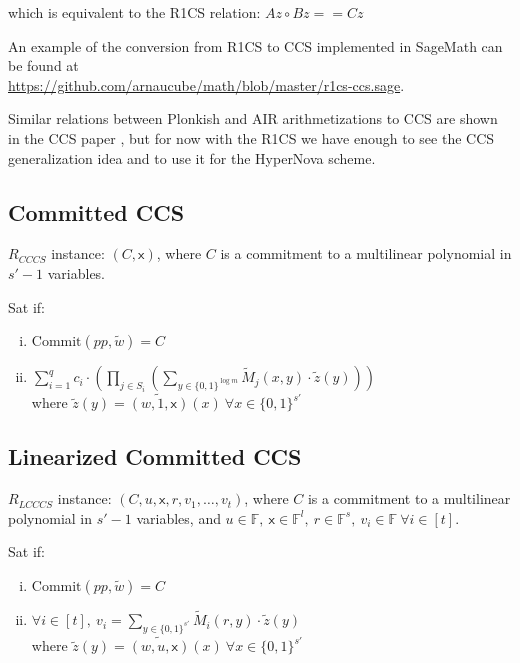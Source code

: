 \documentclass{article}
\theoremstyle{definition}
\begin{document}
which is equivalent to the R1CS relation: $Az \circ Bz == Cz$

An example of the conversion from R1CS to CCS implemented in SageMath can be found at\\
\href{https://github.com/arnaucube/math/blob/master/r1cs-ccs.sage}{https://github.com/arnaucube/math/blob/master/r1cs-ccs.sage}.

Similar relations between Plonkish and AIR arithmetizations to CCS are shown in the CCS paper \cite{cryptoeprint:2023/552}, but for now with the R1CS we have enough to see the CCS generalization idea and to use it for the HyperNova scheme.

\subsection{Committed CCS}
$R_{CCCS}$ instance: $(C, \mathsf{x})$, where $C$ is a commitment to a multilinear polynomial in $s'-1$ variables.

Sat if:
\begin{enumerate}[i.]
	\item $\text{Commit}(pp, \widetilde{w}) = C$
	\item $\sum_{i=1}^q c_i \cdot \left( \prod_{j \in S_i} \left( \sum_{y \in \{0,1\}^{\log m}} \widetilde{M}_j(x, y) \cdot \widetilde{z}(y) \right) \right)$\\
		where $\widetilde{z}(y) = \widetilde{(w, 1, \mathsf{x})}(x) ~\forall x \in \{0, 1\}^{s'}$
\end{enumerate}


\subsection{Linearized Committed CCS}
$R_{LCCCS}$ instance: $(C, u, \mathsf{x}, r, v_1, \ldots, v_t)$, where $C$ is a commitment to a multilinear polynomial in $s'-1$ variables, and $u \in \mathbb{F},~ \mathsf{x} \in \mathbb{F}^l,~ r \in \mathbb{F}^s,~ v_i \in \mathbb{F} ~\forall i \in [t]$.

Sat if:
\begin{enumerate}[i.]
	\item $\text{Commit}(pp, \widetilde{w}) = C$
	\item $\forall i \in [t],~ v_i = \sum_{y \in \{0,1\}^{s'}} \widetilde{M}_i(r, y) \cdot \widetilde{z}(y)$\\
		where $\widetilde{z}(y) = \widetilde{(w, u, \mathsf{x})}(x) ~\forall x \in \{0, 1\}^{s'}$
\end{enumerate}
\end{document}
